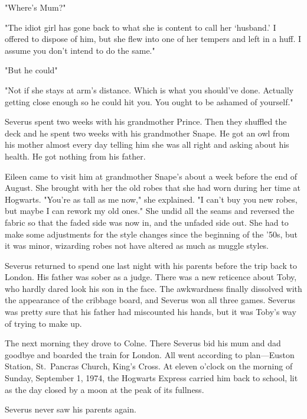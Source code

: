 "Where's Mum?"

"The idiot girl has gone back to what she is content to call her `husband.' I offered to dispose of him, but she flew into one of her tempers and left in a huff. I assume you don't intend to do the same."

"But he could{\el}"

"Not if she stays at arm's distance. Which is what you should've done. Actually getting close enough so he could hit you. You ought to be ashamed of yourself."

Severus spent two weeks with his grandmother Prince. Then they shuffled the deck and he spent two weeks with his grandmother Snape. He got an owl from his mother almost every day telling him she was all right and asking about his health. He got nothing from his father.

Eileen came to visit him at grandmother Snape's about a week before the end of August. She brought with her the old robes that she had worn during her time at Hogwarts. "You're as tall as me now," she explained. "I can't buy you new robes, but maybe I can rework my old ones." She undid all the seams and reversed the fabric so that the faded side was now in, and the unfaded side out. She had to make some adjustments for the style changes since the beginning of the '50s, but it was minor, wizarding robes not have altered as much as muggle styles.

Severus returned to spend one last night with his parents before the trip back to London. His father was sober as a judge. There was a new reticence about Toby, who hardly dared look his son in the face. The awkwardness finally dissolved with the appearance of the cribbage board, and Severus won all three games. Severus was pretty sure that his father had miscounted his hands, but it was Toby's way of trying to make up.

The next morning they drove to Colne. There Severus bid his mum and dad goodbye and boarded the train for London. All went according to plan—Euston Station, St.~Pancras Church, King's Cross. At eleven o'clock on the morning of Sunday, September 1, 1974, the Hogwarts Express carried him back to school, lit as the day closed by a moon at the peak of its fullness.

Severus never saw his parents again.


